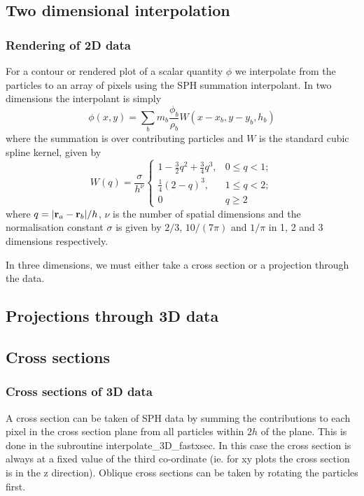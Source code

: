 \documentclass[a4paper,12pt]{article}
\begin{document}
\subsection{Two dimensional interpolation}
\subsubsection{Rendering of 2D data}
 For a contour or rendered plot of a scalar quantity $\phi$ we
interpolate from the particles to an array of pixels using the SPH summation
interpolant. In two dimensions the interpolant is simply
\begin{equation}
\phi(x,y) = \sum_b m_b \frac{\phi_b}{\rho_b} W(x - x_b, y-y_b, h_b)
\end{equation}
where the summation is over contributing particles and $W$ is the standard cubic spline kernel, given by
\begin{equation}
W(q) = \frac{\sigma}{h^\nu}\left\{ \begin{array}{ll}
1 - \frac{3}{2}q^2 + \frac{3}{4}q^3, & 0 \le q < 1; \\
\frac{1}{4}(2-q)^3, & 1 \le q < 2; \\
0 & q \ge 2 \end{array} \right.
\end{equation}
where $q = \vert {\bf r}_a - {\bf r}_b \vert / h$, $\nu$ is the number of spatial
dimensions and the normalisation constant $\sigma$ is given by $2/3$, $10/(7\pi)$ and $1/\pi$ in
1, 2 and 3 dimensions respectively.

In three dimensions, we must either take a cross section or a projection
through the data.

\subsection{Projections through 3D data}

\subsection{Cross sections}

\subsubsection{Cross sections of 3D data}
 A cross section can be taken of SPH data by summing the
contributions to each pixel in the cross section plane from all particles within
$2h$ of the plane. This is done in the subroutine interpolate\_3D\_fastxsec. In
this case the cross section is always at a fixed value of the third co-ordinate
(ie. for xy plots the cross section is in the z direction). Oblique cross
sections can be taken by rotating the particles first.
\end{document}
